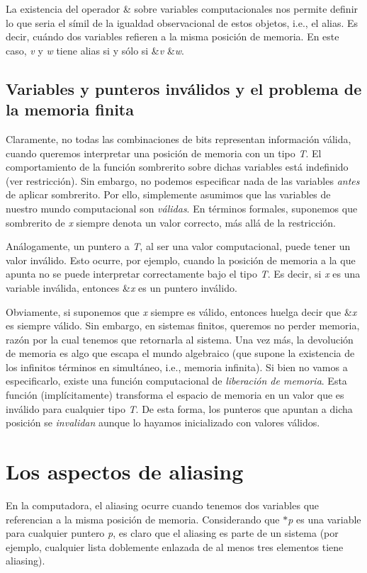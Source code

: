 La existencia del operador \& sobre variables computacionales nos permite definir lo que seria el símil de la igualdad observacional de estos objetos, i.\+e., el alias. Es decir, cuándo dos variables refieren a la misma posición de memoria. En este caso, {\itshape v} y {\itshape w} tiene alias si y sólo si \&{\itshape v}  \&{\itshape w}.\hypertarget{Aliasing_sec-invalido}{}\subsection{Variables y punteros inválidos y el problema de la memoria finita}\label{Aliasing_sec-invalido}
Claramente, no todas las combinaciones de bits representan información válida, cuando queremos interpretar una posición de memoria con un tipo {\itshape T}. El comportamiento de la función sombrerito sobre dichas variables está indefinido (ver restricción). Sin embargo, no podemos especificar nada de las variables {\itshape antes} de aplicar sombrerito. Por ello, simplemente asumimos que las variables de nuestro mundo computacional son {\itshape válidas}. En términos formales, suponemos que sombrerito de {\itshape x} siempre denota un valor correcto, más allá de la restricción.

Análogamente, un puntero a {\itshape T}, al ser una valor computacional, puede tener un valor inválido. Esto ocurre, por ejemplo, cuando la posición de memoria a la que apunta no se puede interpretar correctamente bajo el tipo {\itshape T}. Es decir, si {\itshape x} es una variable inválida, entonces \&{\itshape x} es un puntero inválido.

Obviamente, si suponemos que {\itshape x} siempre es válido, entonces huelga decir que \&{\itshape x} es siempre válido. Sin embargo, en sistemas finitos, queremos no perder memoria, razón por la cual tenemos que retornarla al sistema. Una vez más, la devolución de memoria es algo que escapa el mundo algebraico (que supone la existencia de los infinitos términos en simultáneo, i.\+e., memoria infinita). Si bien no vamos a especificarlo, existe una función computacional de {\itshape liberación de memoria}. Esta función (implícitamente) transforma el espacio de memoria en un valor  que es inválido para cualquier tipo {\itshape T}. De esta forma, los punteros que apuntan a dicha posición se {\itshape invalidan} aunque lo hayamos inicializado con valores válidos.\hypertarget{Aliasing_sec-aliasing}{}\section{Los aspectos de aliasing}\label{Aliasing_sec-aliasing}
En la computadora, el aliasing ocurre cuando tenemos dos variables que referencian a la misma posición de memoria. Considerando que $\ast${\itshape p} es una variable para cualquier puntero {\itshape p}, es claro que el aliasing es parte de un sistema (por ejemplo, cualquier lista doblemente enlazada de al menos tres elementos tiene aliasing).

